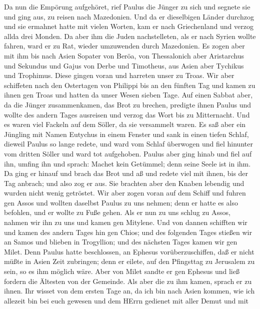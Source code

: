  Da nun die Empörung aufgehöret, rief Paulus die Jünger zu
sich und segnete sie und ging aus, zu reisen nach Mazedonien.
 Und da er dieselbigen Länder durchzog und sie ermahnet
hatte mit vielen Worten, kam er nach Griechenland und verzog allda drei
Monden.  Da aber ihm die Juden nachstelleten, als er nach
Syrien wollte fahren, ward er zu Rat, wieder umzuwenden durch
Mazedonien.  Es zogen aber mit ihm bis nach Asien Sopater
von Beröa, von Thessalonich aber Aristarchus und Sekundus und Gajus von
Derbe und Timotheus, aus Asien aber Tychikus und Trophimus. 
Diese gingen voran und harreten unser zu Troas.  Wir aber
schiffeten nach den Ostertagen von Philippi bis an den fünften Tag und
kamen zu ihnen gen Troas und hatten da unser Wesen sieben Tage.
 Auf einen Sabbat aber, da die Jünger zusammenkamen, das
Brot zu brechen, predigte ihnen Paulus und wollte des andern Tages
ausreisen und verzog das Wort bis zu Mitternacht.  Und es
waren viel Fackeln auf dem Söller, da sie versammelt waren. 
Es saß aber ein Jüngling mit Namen Eutychus in einem Fenster und sank in
einen tiefen Schlaf, dieweil Paulus so lange redete, und ward vom Schlaf
überwogen und fiel hinunter vom dritten Söller und ward tot aufgehoben.
 Paulus aber ging hinab und fiel auf ihn, umfing ihn und
sprach: Machet kein Getümmel; denn seine Seele ist in ihm. 
Da ging er hinauf und brach das Brot und aß und redete viel mit ihnen,
bis der Tag anbrach; und also zog er aus.  Sie brachten
aber den Knaben lebendig und wurden nicht wenig getröstet. 
Wir aber zogen voran auf dem Schiff und fuhren gen Assos und wollten
daselbst Paulus zu uns nehmen; denn er hatte es also befohlen, und er
wollte zu Fuße gehen.  Als er nun zu uns schlug zu Assos,
nahmen wir ihn zu uns und kamen gen Mitylene.  Und von
dannen schifften wir und kamen des andern Tages hin gen Chios; und des
folgenden Tages stießen wir an Samos und blieben in Trogyllion; und des
nächsten Tages kamen wir gen Milet.  Denn Paulus hatte
beschlossen, an Ephesus vorüberzuschiffen, daß er nicht müßte in Asien
Zeit zubringen; denn er eilete, auf den Pfingsttag zu Jerusalem zu sein,
so es ihm möglich wäre.  Aber von Milet sandte er gen
Ephesus und ließ fordern die Ältesten von der Gemeinde. 
Als aber die zu ihm kamen, sprach er zu ihnen. Ihr wisset von dem ersten
Tage an, da ich bin nach Asien kommen, wie ich allezeit bin bei euch
gewesen  und dem HErrn gedienet mit aller Demut und mit
